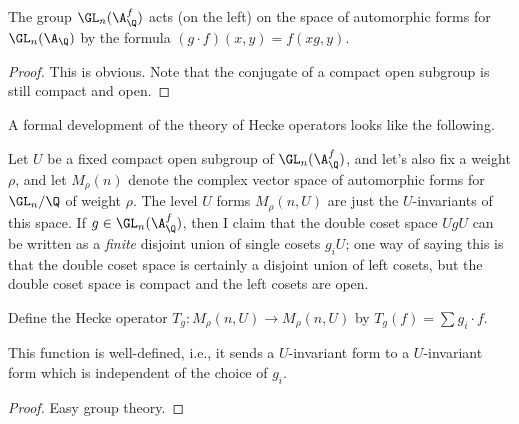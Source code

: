 \begin{lemma} The group $\GL_n(\A_{\Q}^f)$ acts (on the left) on the space of automorphic forms
  for $\GL_n(\A_{\Q})$ by the formula $(g\cdot f)(x,y)=f(xg,y)$.
\end{lemma}
\begin{proof}
  This is obvious. Note that the conjugate of a compact open subgroup is still
  compact and open.
\end{proof}

A formal development of the theory of Hecke operators looks like the following.

Let $U$ be a fixed compact open subgroup of $\GL_n(\A_{\Q}^f)$, and let's also fix
a weight $\rho$, and let $M_\rho(n)$ denote the complex vector space of automorphic
forms for $\GL_n/\Q$ of weight $\rho$. The level $U$ forms $M_\rho(n,U)$ are just the $U$-invariants
of this space. If $g\in\GL_n(\A_{\Q}^f)$, then I
claim that the double coset space $UgU$ can be written as a \emph{finite} disjoint union
of single cosets $g_iU$; one way of saying this is that the double coset space is certainly
a disjoint union of left cosets, but the double coset space is compact and the left cosets
are open.

Define the Hecke operator $T_g:M_\rho(n,U)\to M_\rho(n,U)$ by
$T_g(f)=\sum g_i\cdot f$.

\begin{lemma} This function is well-defined, i.e., it sends a $U$-invariant form to
  a $U$-invariant form which is independent of the choice of $g_i$.
\end{lemma}
\begin{proof} Easy group theory.
\end{proof}

